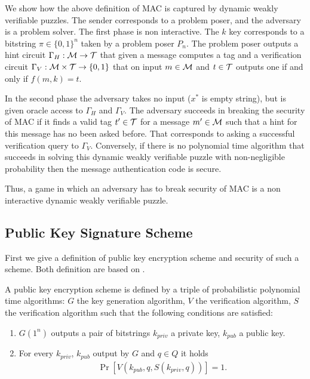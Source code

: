 \documentclass[11pt,a4paper,titlepage]{memoir}
\begin{document}
We show how the above definition of MAC is captured by dynamic weakly verifiable puzzles.
The sender corresponds to a problem poser, and the adversary is a problem solver.
The first phase is non interactive. The $k$ key corresponds to a bitstring $\pi \in \{0,1\}^{n}$ taken by a problem poser $P_n$.
The problem poser outputs a hint circuit $\Gamma_H: \mathcal{M} \rightarrow \mathcal{T}$ that given a message computes a tag
and a verification circuit $\Gamma_V: \mathcal{M} \times \mathcal{T} \rightarrow \{0,1\}$ that on input $m \in \mathcal{M}$ and $t \in \mathcal{T}$
outputs one if and only if $f(m, k) = t$.

In the second phase the adversary takes no input ($x^*$ is empty string), but is given oracle access to $\Gamma_H$ and $\Gamma_V$.
The adversary succeeds in breaking the security of MAC if it finds a valid tag $t' \in \mathcal{T}$ for a message $m' \in \mathcal{M}$ such that a hint for this message
has no been asked before. That corresponds to asking a successful verification query to $\Gamma_V$.
Conversely, if there is no polynomial time algorithm that succeeds in solving this dynamic weakly verifiable puzzle with non-negligible probability
then the message authentication code is secure.

Thus, a game in which an adversary has to break security of MAC is a non interactive dynamic weakly verifiable puzzle.

\subsection{Public Key Signature Scheme}
First we give a definition of public key encryption scheme and security of such a scheme. Both definition are based on \cite{Goldreich:2004:FCV:975541}.

\begin{definition}
A public key encryption scheme is defined by a triple of probabilistic polynomial time algorithms:
$G$ the key generation algorithm, $V$ the verification algorithm, $S$ the verification algorithm such that the following conditions are satisfied:
\begin{enumerate}[]
  \item $G(1^n)$ outputs a pair of bitstrings $k_{priv}$ a private key, $k_{pub}$ a public key.
  \item For every $k_{priv}$, $k_{pub}$ output by $G$ and $q \in Q$ it holds
    \begin{align*}
      \Pr[V(k_{pub}, q, S(k_{priv}, q))] = 1.
    \end{align*}
\end{enumerate}
\end{definition}
\end{document}

